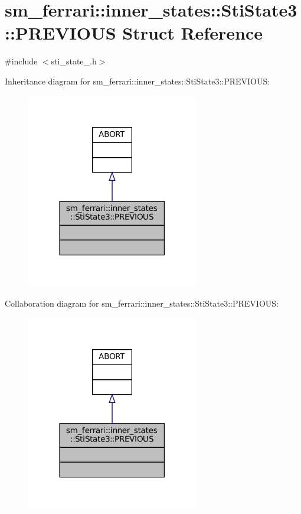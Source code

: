 \hypertarget{structsm__ferrari_1_1inner__states_1_1StiState3_1_1PREVIOUS}{}\section{sm\+\_\+ferrari\+:\+:inner\+\_\+states\+:\+:Sti\+State3\+:\+:P\+R\+E\+V\+I\+O\+US Struct Reference}
\label{structsm__ferrari_1_1inner__states_1_1StiState3_1_1PREVIOUS}


{\ttfamily \#include $<$sti\+\_\+state\+\_.\+h$>$}



Inheritance diagram for sm\+\_\+ferrari\+:\+:inner\+\_\+states\+:\+:Sti\+State3\+:\+:P\+R\+E\+V\+I\+O\+US\+:
\nopagebreak
\begin{figure}[H]
\begin{center}
\leavevmode
\includegraphics[width=213pt]{structsm__ferrari_1_1inner__states_1_1StiState3_1_1PREVIOUS__inherit__graph}
\end{center}
\end{figure}


Collaboration diagram for sm\+\_\+ferrari\+:\+:inner\+\_\+states\+:\+:Sti\+State3\+:\+:P\+R\+E\+V\+I\+O\+US\+:
\nopagebreak
\begin{figure}[H]
\begin{center}
\leavevmode
\includegraphics[width=213pt]{structsm__ferrari_1_1inner__states_1_1StiState3_1_1PREVIOUS__coll__graph}
\end{center}
\end{figure}


